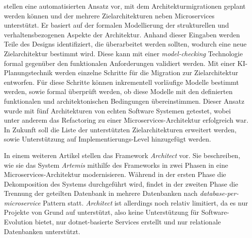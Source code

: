  stellen eine automatisierten Ansatz vor, mit dem Architekturmigrationen geplant werden können und der mehrere Zielarchitekturen neben Microservices unterstützt.
Er basiert auf der formalen Modellierung der strukturellen und verhaltensbezogenen Aspekte der Architektur.
Anhand dieser Eingaben werden Teile des Designs identifiziert, die überarbeitet werden sollten, wodurch eine neue Zielarchitektur bestimmt wird.
Diese kann mit einer \emph{model-checking} Technologie formal gegenüber den funktionalen Anforderungen validiert werden.
Mit einer KI-Planungstechnik werden einzelne Schritte für die Migration zur Zielarchitektur entworfen.
Für diese Schritte können inkrementell vorläufige Modelle bestimmt werden, sowie formal überprüft werden, ob diese Modelle mit den definierten funktionalen und architektonischen Bedingungen übereinstimmen.
Dieser Ansatz wurde mit fünf Architekturen von echten Software Systemen getestet, wobei unter anderem das Refactoring zu einer Microservices-Architektur erfolgreich war.
In Zukunft soll die Liste der unterstützten Zielarchitekturen erweitert werden, sowie Unterstützung auf Implementierungs-Level hinzugefügt werden.

In einem weiteren Artikel stellen  das Framework \emph{Architect} vor.
Sie beschreiben, wie sie das System \emph{Artemis} mithilfe des Frameworks in zwei Phasen in eine Microservices-Architektur modernisieren.
Während in der ersten Phase die Dekomposition des Systems durchgeführt wird, findet in der zweiten Phase die Trennung der geteilten Datenbank in mehrere Datenbanken nach \emph{database-per-microservice} Pattern statt.
\emph{Architect} ist allerdings noch relativ limitiert, da es nur Projekte von Grund auf unterstützt, also keine Unterstützung für Software-Evolution bietet, nur dotnet-basierte Services erstellt und nur relationale Datenbanken unterstützt.
